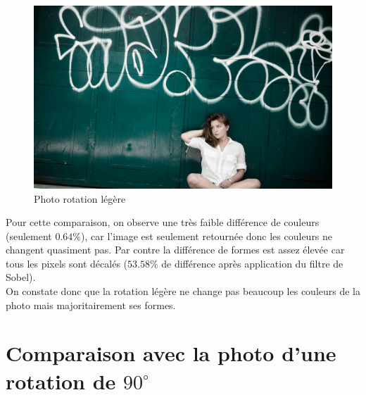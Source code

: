 \documentclass[]{article}
\begin{document}
\begin{figure}[htbp]
\centering
\includegraphics{photos/rotate.jpg}
\caption{Photo rotation légère}
\end{figure}

Pour cette comparaison, on observe une très faible différence de
couleurs (seulement $0.64\%$), car l'image est seulement retournée donc
les couleurs ne changent quasiment pas. Par contre la différence de
formes est assez élevée car tous les pixels sont décalés ($53.58\%$ de
différence après application du filtre de Sobel).\\On constate donc que
la rotation légère ne change pas beaucoup les couleurs de la photo mais
majoritairement ses formes.

\newpage

\section{Comparaison avec la photo d'une rotation de
$90^{\circ}$}\label{comparaison-avec-la-photo-dune-rotation-de-90circ}
\end{document}
